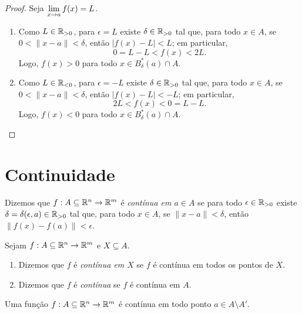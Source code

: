 \begin{proof}
    Seja $\displaystyle \lim_{x \to a} f(x) = L$.
        \begin{enumerate}[leftmargin=*, align=left, label=\textbf{(\alph*)}]
            \item Como $L \in \mathbb{R}_{>0}$, para $\epsilon = L$ existe $\delta \in \mathbb{R}_{>0}$ tal que, para todo $x \in A$, se $0<\|x-a\|<\delta$, então $|f(x) - L| < L$; em particular,
                \[
                    0 = L - L < f(x) < 2L.
                \]
            Logo, $f(x) > 0$ para todo $x \in B^*_{\delta}(a) \cap A$. \blackproof
            \item Como $L \in \mathbb{R}_{<0}$, para $\epsilon = -L$ existe $\delta \in \mathbb{R}_{>0}$ tal que, para todo $x \in A$, se $0<\|x-a\|<\delta$, então $|f(x) - L| < -L$; em particular,
                \[
                    2L < f(x) < 0 = L - L.
                \]
            Logo, $f(x) < 0$ para todo $x \in B^*_{\delta}(a) \cap A$. \blackproof
        \end{enumerate}
\end{proof}

\section{Continuidade}

\begin{definition}[Continuidade] \label{def.calc2:continuidade}
    Dizemos que $f : A \subseteq \mathbb{R}^n \to \mathbb{R}^m$ é \emph{contínua em $a \in A$} se para todo $\epsilon \in \mathbb{R}_{>0}$ existe $\delta = \delta(\epsilon, a) \in \mathbb{R}_{>0}$ tal que, para todo $x \in A$, se $\| x-a \| < \delta$, então $\| f(x) - f(a) \| < \epsilon$.
\end{definition}

\begin{definition}
    Sejam $f : A \subseteq \mathbb{R}^n \to \mathbb{R}^m$ e $X \subseteq A$.
        \begin{enumerate}[leftmargin=*, align=left, label=\textbf{(\alph*)}]
            \item Dizemos que $f$ é \emph{contínua em $X$} se $f$ é contínua em todos os pontos de $X$.
            \item Dizemos que $f$ é \emph{contínua} se $f$ é contínua em $A$.
        \end{enumerate}
\end{definition}

\begin{proposition} \label{prop.calc2:continuidade_em_ponto_isolado}
    Uma função $f : A \subseteq \mathbb{R}^n \to \mathbb{R}^m$ é contínua em todo ponto $a \in A \setminus A'$.
\end{proposition}


